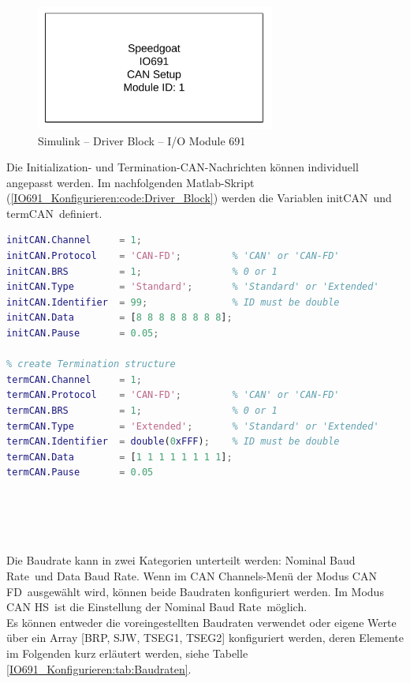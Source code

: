 \pagebreak[1]
\begin{figure}[!ht]
	\begin{center}
		\includegraphics[width=0.7\textwidth]{img/4_simulink/IO691.png}
		\caption{Simulink – Driver Block – I/O Module 691 \cite{speedgoat:IO691}}
		\label{IO691_Konfigurieren:img:Driver_Block}
	\end{center}
\end{figure}
\pagebreak[1]


Die \frqq Initialization\flqq- und \frqq Termination\flqq-CAN-Nachrichten können individuell angepasst werden. Im nachfolgenden Matlab-Skript (\ref{IO691_Konfigurieren:code:Driver_Block}) werden die Variablen \frqq initCAN\flqq\ und \frqq termCAN\flqq\ definiert.



\pagebreak[4]
\begin{lstlisting}[language=Matlab, caption=Initialization and Termination Structure \cite{speedgoat:IO691:CAN_Message}\label{IO691_Konfigurieren:code:Driver_Block}]
% create Initialization structure
initCAN.Channel     = 1;
initCAN.Protocol    = 'CAN-FD';         % 'CAN' or 'CAN-FD'
initCAN.BRS         = 1;                % 0 or 1
initCAN.Type        = 'Standard';       % 'Standard' or 'Extended'
initCAN.Identifier  = 99;               % ID must be double
initCAN.Data        = [8 8 8 8 8 8 8 8];
initCAN.Pause       = 0.05;

% create Termination structure
termCAN.Channel     = 1;
termCAN.Protocol    = 'CAN-FD';         % 'CAN' or 'CAN-FD'
termCAN.BRS         = 1;                % 0 or 1
termCAN.Type        = 'Extended';       % 'Standard' or 'Extended'     
termCAN.Identifier  = double(0xFFF);    % ID must be double
termCAN.Data        = [1 1 1 1 1 1 1 1];
termCAN.Pause       = 0.05



 
\end{lstlisting}
\pagebreak[1]

Die Baudrate kann in zwei Kategorien unterteilt werden: \frqq Nominal Baud Rate\flqq\ und \frqq Data Baud Rate\flqq. Wenn im \frqq CAN Channels\flqq-Menü der Modus \frqq CAN FD\flqq\ ausgewählt wird, können beide Baudraten konfiguriert werden. Im Modus \frqq CAN HS\flqq\ ist die Einstellung der \frqq Nominal Baud Rate\flqq\ möglich. \\
Es können entweder die voreingestellten Baudraten verwendet oder eigene Werte über ein Array [BRP, SJW, TSEG1, TSEG2] konfiguriert werden, deren Elemente im Folgenden kurz erläutert werden, siehe Tabelle \ref{IO691_Konfigurieren:tab:Baudraten}.

